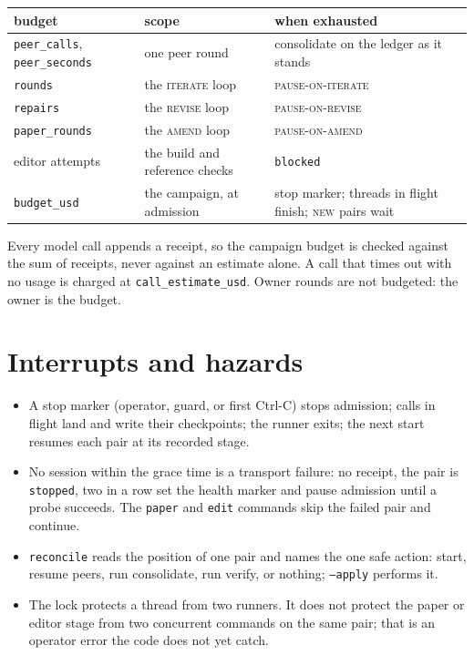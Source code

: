 \documentclass[11pt,a4paper]{article}
\newcommand{\st}[1]{\textsc{#1}}
\newcommand{\file}[1]{\texttt{#1}}
\begin{document}
\begin{center}
\begin{tabularx}{\textwidth}{@{}llX@{}}
\toprule
budget & scope & when exhausted \\
\midrule
\file{peer\_calls}, \file{peer\_seconds} & one peer round & consolidate on the ledger as it stands \\
\file{rounds} & the \st{iterate} loop & \st{pause-on-iterate} \\
\file{repairs} & the \st{revise} loop & \st{pause-on-revise} \\
\file{paper\_rounds} & the \st{amend} loop & \st{pause-on-amend} \\
editor attempts & the build and reference checks & \file{blocked} \\
\file{budget\_usd} & the campaign, at admission & stop marker; threads in flight finish; \st{new} pairs wait \\
\bottomrule
\end{tabularx}
\end{center}

\noindent Every model call appends a receipt, so the campaign budget is checked against the sum
of receipts, never against an estimate alone. A call that times out with no usage is charged at
\file{call\_estimate\_usd}. Owner rounds are not budgeted: the owner is the budget.

\section{Interrupts and hazards}

\begin{itemize}\setlength{\itemsep}{1pt}
  \item A stop marker (operator, guard, or first Ctrl-C) stops admission; calls in flight land
    and write their checkpoints; the runner exits; the next start resumes each pair at its
    recorded stage.
  \item No session within the grace time is a transport failure: no receipt, the pair is
    \file{stopped}, two in a row set the health marker and pause admission until a probe
    succeeds. The \file{paper} and \file{edit} commands skip the failed pair and continue.
  \item \file{reconcile} reads the position of one pair and names the one safe action: start,
    resume peers, run consolidate, run verify, or nothing; \file{--apply} performs it.
  \item The lock protects a thread from two runners. It does not protect the paper or editor
    stage from two concurrent commands on the same pair; that is an operator error the code
    does not yet catch.
\end{itemize}
\end{document}
